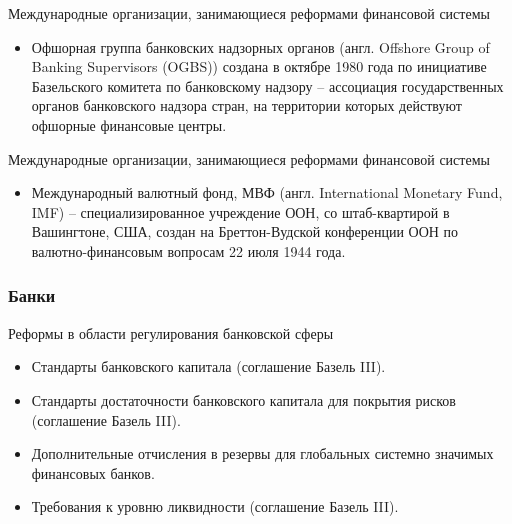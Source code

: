 \documentclass[_Banking_p1.tex]{subfiles}
\begin{document}
\begin{frame}{\setfontsize{12pt} Международные организации, занимающиеся реформами финансовой системы}
\begin{itemize}[<+->]
\item
Офшорная группа банковских надзорных органов (англ. Offshore Group of Banking Supervisors (OGBS)) создана в октябре 1980 года по инициативе Базельского комитета по банковскому надзору – ассоциация государственных органов банковского надзора стран, на территории которых действуют офшорные финансовые центры.
\end{itemize}

\end{frame}
\begin{frame}{\setfontsize{14pt} Международные организации, занимающиеся реформами финансовой системы}
\begin{itemize}[<+->]

\item
Международный валютный фонд, МВФ (англ. International Monetary Fund, IMF) – специализированное учреждение ООН, со штаб-квартирой в Вашингтоне, США, создан на Бреттон-Вудской конференции ООН по валютно-финансовым вопросам 22 июля 1944 года.


\end{itemize}

\end{frame}

\subsubsection{Банки}
\begin{frame}{\setfontsize{12pt}Реформы в области регулирования банковской сферы}
\begin{itemize}[<+->]

\item
Стандарты банковского капитала (соглашение Базель III).

\item
Стандарты достаточности банковского капитала для покрытия рисков (соглашение Базель III).

\item
Дополнительные отчисления в резервы для глобальных системно значимых финансовых банков.

\item
Требования к уровню ликвидности (соглашение Базель III).
\end{itemize}

\end{frame}
\end{document}
